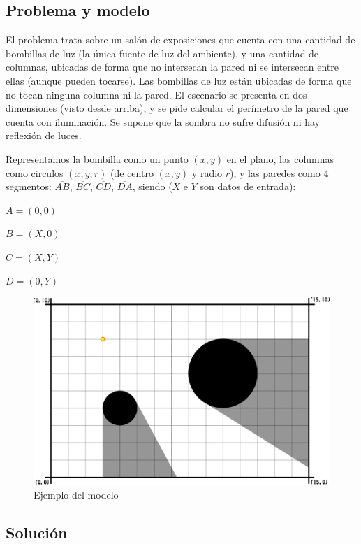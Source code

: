 \subsection*{Problema y modelo}
El problema trata sobre un salón de exposiciones que cuenta con una cantidad
de bombillas de luz (la única fuente de luz del ambiente), y una cantidad de
columnas, ubicadas de forma que no intersecan la pared ni se intersecan entre
ellas (aunque pueden tocarse). Las bombillas de luz están ubicadas de forma
que no tocan ninguna columna ni la pared. El escenario se presenta en dos
dimensiones (visto desde arriba), y se pide calcular el perímetro de la pared
que cuenta con iluminación. Se supone que la sombra no sufre difusión ni hay
reflexión de luces.

Representamos la bombilla como un punto $(x,y)$ en el plano, las columnas como
circulos $(x,y,r)$ (de centro $(x,y)$ y radio $r$), y las paredes como 4
segmentos: $\overline{AB}$, $\overline{BC}$, $\overline{CD}$, $\overline{DA}$,
siendo ($X$ e $Y$ son datos de entrada):

\vspace{0.2cm}
$A = (0, 0)$

$B = (X, 0)$

$C = (X, Y)$

$D = (0, Y)$
\vspace{0.2cm}

\begin{figure}[H]
\centering
\label{bl_1}
\caption{\sc Ejemplo del modelo}
\includegraphics[scale=1.0]{./figuras/bl_1.png}
\end{figure} 

\subsection*{Solución}

